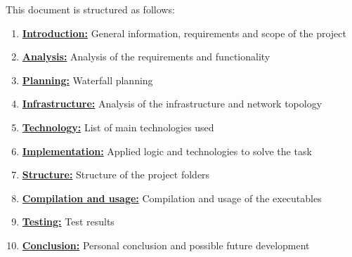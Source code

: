 \documentclass[../documentation.tex]{subfiles}
\begin{document}
This document is structured as follows:

\begin{enumerate}
    \item \hyperlink{section.1}{\textbf{Introduction:}}
        General information, requirements and scope of the project
    \item \hyperlink{section.2}{\textbf{Analysis:}}
        Analysis of the requirements and functionality
    \item \hyperlink{section.3}{\textbf{Planning:}}
        Waterfall planning
    \item \hyperlink{section.4}{\textbf{Infrastructure:}}
        Analysis of the infrastructure and network topology
    \item \hyperlink{section.5}{\textbf{Technology:}}
        List of main technologies used
    \item \hyperlink{section.6}{\textbf{Implementation:}}
        Applied logic and technologies to solve the task
    \item \hyperlink{section.7}{\textbf{Structure:}}
        Structure of the project folders
    \item \hyperlink{section.8}{\textbf{Compilation and usage:}}
        Compilation and usage of the executables
    \item \hyperlink{section.9}{\textbf{Testing:}}
        Test results
    \item \hyperlink{section.10}{\textbf{Conclusion:}}
        Personal conclusion and possible future development
\end{enumerate}
\end{document}
